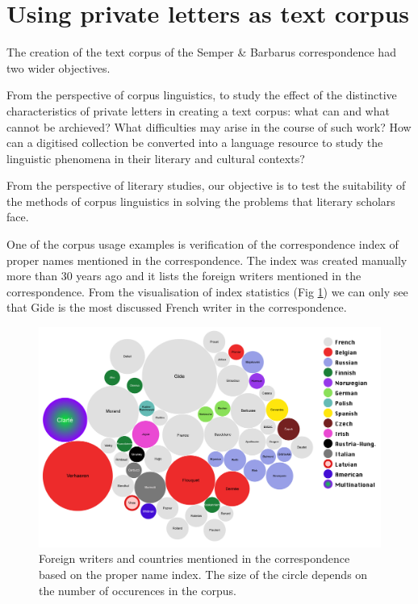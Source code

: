 \documentclass[runningheads]{llncs}
\begin{document}
\section{Using private letters as text corpus}

The creation of the text corpus of the Semper \& Barbarus correspondence had two wider objectives.  

From the perspective of corpus linguistics, to study the effect of the distinctive characteristics of private letters in creating a text corpus: what can and what cannot be archieved? What difficulties may arise in the course of such work? How can a digitised collection be converted into a language resource  to study the linguistic phenomena in their literary and cultural contexts?

From the perspective of literary studies, our objective is to test the suitability of the methods of corpus linguistics in solving the problems that literary scholars face.

One of the corpus usage examples is verification of the correspondence index of proper names mentioned in the correspondence. The index was created manually more than 30 years ago and it lists the foreign writers mentioned in the correspondence. From the visualisation of index statistics (Fig \ref{fig2}) we can only see that Gide is the most discussed French writer in the correspondence.

\begin{figure}
  \includegraphics[width=\textwidth]{mummud}
  \caption{Foreign writers and countries mentioned in the correspondence based on the proper name index.  The size of the circle depends on the number of occurences in the corpus.}
  \label{fig2}
\end{figure}
\end{document}
